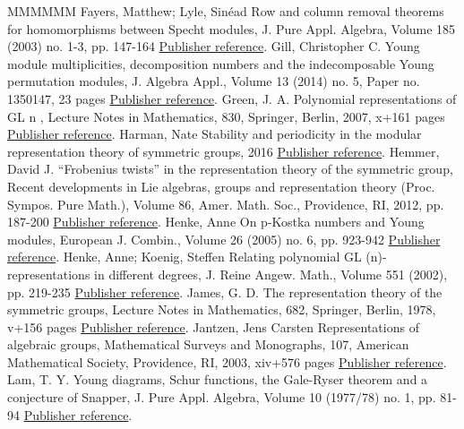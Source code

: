 \documentclass[11pt]{article}
\theoremstyle{definition}
\numberwithin{equation}{section}
\numberwithin{equation}{section}
\begin{document}
\begin{thebibliography}{MMMMMM}
 Fayers, Matthew; Lyle, Sinéad Row and column removal theorems for homomorphisms between Specht modules, J. Pure Appl. Algebra, Volume 185 (2003) no. 1-3, pp. 147-164 \href{https://alco.centre-mersenne.org/articles/10.5802/alco.397/#FL}{Publisher reference}.
 Gill, Christopher C. Young module multiplicities, decomposition numbers and the indecomposable Young permutation modules, J. Algebra Appl., Volume 13 (2014) no. 5, Paper no. 1350147, 23 pages \href{https://alco.centre-mersenne.org/articles/10.5802/alco.397/#Gi}{Publisher reference}.
 Green, J. A. Polynomial representations of  GL  n , Lecture Notes in Mathematics, 830, Springer, Berlin, 2007, x+161 pages \href{https://alco.centre-mersenne.org/articles/10.5802/alco.397/#Gr}{Publisher reference}.
 Harman, Nate Stability and periodicity in the modular representation theory of symmetric groups, 2016 \href{https://alco.centre-mersenne.org/articles/10.5802/alco.397/#Ha}{Publisher reference}.
 Hemmer, David J. “Frobenius twists” in the representation theory of the symmetric group, Recent developments in Lie algebras, groups and representation theory (Proc. Sympos. Pure Math.), Volume 86, Amer. Math. Soc., Providence, RI, 2012, pp. 187-200 \href{https://alco.centre-mersenne.org/articles/10.5802/alco.397/#Hem2}{Publisher reference}.
 Henke, Anne On p-Kostka numbers and Young modules, European J. Combin., Volume 26 (2005) no. 6, pp. 923-942 \href{https://alco.centre-mersenne.org/articles/10.5802/alco.397/#Hen}{Publisher reference}.
 Henke, Anne; Koenig, Steffen Relating polynomial  GL (n)-representations in different degrees, J. Reine Angew. Math., Volume 551 (2002), pp. 219-235 \href{https://alco.centre-mersenne.org/articles/10.5802/alco.397/#HK}{Publisher reference}.
 James, G. D. The representation theory of the symmetric groups, Lecture Notes in Mathematics, 682, Springer, Berlin, 1978, v+156 pages \href{https://alco.centre-mersenne.org/articles/10.5802/alco.397/#Jam}{Publisher reference}.
 Jantzen, Jens Carsten Representations of algebraic groups, Mathematical Surveys and Monographs, 107, American Mathematical Society, Providence, RI, 2003, xiv+576 pages \href{https://alco.centre-mersenne.org/articles/10.5802/alco.397/#Jan}{Publisher reference}.
 Lam, T. Y. Young diagrams, Schur functions, the Gale-Ryser theorem and a conjecture of Snapper, J. Pure Appl. Algebra, Volume 10 (1977/78) no. 1, pp. 81-94 \href{https://alco.centre-mersenne.org/articles/10.5802/alco.397/#Lam}{Publisher reference}.

\end{thebibliography}
\end{document}
